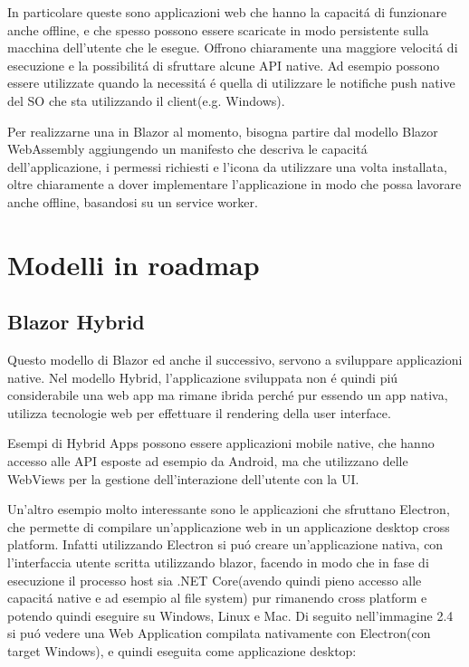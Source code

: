 In particolare queste sono applicazioni web che hanno la capacit\'a di funzionare anche offline, e che spesso possono essere scaricate in modo persistente sulla macchina dell'utente che le esegue.
Offrono chiaramente una maggiore velocit\'a di esecuzione e la possibilit\'a di sfruttare alcune API native.
Ad esempio possono essere utilizzate quando la necessit\'a \'e quella di utilizzare le notifiche push native del SO che sta utilizzando il client(e.g. Windows).

Per realizzarne una in Blazor al momento, bisogna partire dal modello Blazor WebAssembly aggiungendo un manifesto che descriva le capacit\'a dell'applicazione, i permessi richiesti e l'icona da utilizzare una volta installata, oltre chiaramente a dover implementare l'applicazione in modo che possa lavorare anche offline, basandosi su un service worker.\cite{blazorPWA}
\pagebreak

\section{Modelli in roadmap}
\subsection{Blazor Hybrid}\label{sez:bhybrid}
Questo modello di Blazor ed anche il successivo, servono a sviluppare applicazioni native.
Nel modello Hybrid, l'applicazione sviluppata non \'e quindi pi\'u considerabile una web app ma rimane ibrida perch\'e pur essendo un app nativa, utilizza tecnologie web per effettuare il rendering della user interface.

Esempi di Hybrid Apps possono essere applicazioni mobile native, che hanno accesso alle API esposte ad esempio da Android, ma che utilizzano delle WebViews per la gestione dell'interazione dell'utente con la UI.

Un'altro esempio molto interessante sono le applicazioni che sfruttano Electron, che permette di compilare un'applicazione web in un applicazione desktop cross platform.
Infatti utilizzando Electron si pu\'o creare un'applicazione nativa, con l'interfaccia utente scritta utilizzando blazor, facendo in modo che in fase di esecuzione il processo host sia .NET Core(avendo quindi pieno accesso alle capacit\'a native e ad esempio al file system) pur rimanendo cross platform e potendo quindi eseguire su Windows, Linux e Mac.
Di seguito nell'immagine 2.4 si pu\'o vedere una Web Application compilata nativamente con Electron(con target Windows), e quindi eseguita come applicazione desktop:

